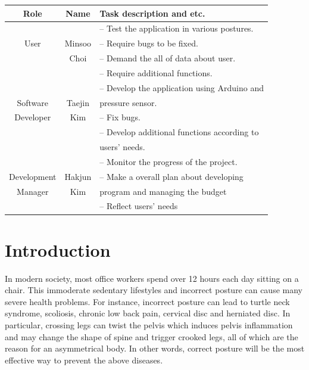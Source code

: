 \documentclass[conference]{IEEEtran}
\begin{document}
\begin{table}

\begin{tabular}{|c|c|l|}\hline

Role & Name & Task description and etc. \\ \hline \hline

&  &  -- Test the application in various postures. \\ 

User & Minsoo & -- Require bugs to be fixed.  \\ 

& Choi & -- Demand the all of data about user. \\ 

&  & -- Require additional functions. \\ \hline

&  &  -- Develop the application using Arduino and\\ 

Software & Taejin & pressure sensor. \\ 

Developer & Kim & -- Fix bugs. \\ 

&  & -- Develop additional functions according to\\ 

&  & users' needs. \\ \hline

&  &  -- Monitor the progress of the project. \\ 

Development & Hakjun & -- Make a overall plan about developing \\ 

Manager& Kim & program and managing the budget \\ 

&  & -- Reflect users' needs \\ \hline

\end{tabular}

\end{table}


\IEEEpeerreviewmaketitle
\large


\section{Introduction}

In modern society, most office workers spend over 12 hours each day sitting on a chair. This immoderate sedentary lifestyles and incorrect posture can cause many severe health problems. For instance, incorrect posture can lead to turtle neck syndrome, scoliosis, chronic low back pain, cervical disc and herniated disc. In particular, crossing legs can twist the pelvis which induces pelvis inflammation and may change the shape of spine and trigger crooked legs, all of which are the reason for an asymmetrical body. In other words, correct posture will be the most effective way to prevent the above diseases.
\end{document}
